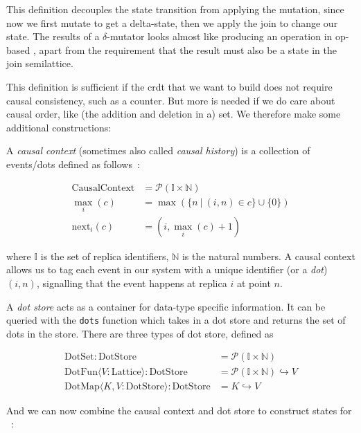 This definition decouples the state transition from applying the mutation, since
now we first mutate to get a delta-state, then we apply the join to change our
state. The results of a \(\delta\)-mutator looks almost like producing an operation
in op-based , apart from the requirement that the result must
also be a state in the join semilattice.

This definition is sufficient if the \acrshort{crdt} that we want to build does
not require causal consistency, such as a counter. But more is needed if we do
care about causal order, like (the addition and deletion in a) set. We therefore 
make some additional constructions:

A \emph{causal context} (sometimes also called \emph{causal history}) is a collection 
of events/dots defined as follows~\cite{almeida2018DeltaCRDT}:

\begin{align*}
  \mathrm{CausalContext} &= \mathcal P(\mathbb I\times \mathbb N) \\
  \max_i(c) &= \max(\{n\ |\ (i, n)\in c\} \cup \{0\}) \\
  \mathrm{next}_i(c) &= (i, \max_i(c) + 1)
\end{align*}

\noindent where \(\mathbb I\) is the set of replica identifiers, \(\mathbb N\)
is the natural numbers. A causal context allows us to tag each event in our system
with a unique identifier (or a \emph{dot}) \((i, n)\), signalling that the event 
happens at replica \(i\) at point \(n\). 

A \emph{dot store} acts as a container for data-type specific information. It can be
queried with the \verb|dots| function which takes in a dot store and returns the 
set of dots in the store. There are three types of dot store, defined as~\cite{almeida2018DeltaCRDT}

\begin{align*}
  \mathrm{DotSet}:\mathrm{DotStore} &= \mathcal P(\mathbb I\times \mathbb N) \\
  \mathrm{DotFun}\langle V:\mathrm{Lattice}\rangle: \mathrm{DotStore} &= \mathcal P(\mathbb I\times \mathbb N) \hookrightarrow V \\ 
  \mathrm{DotMap}\langle K, V:\mathrm{DotStore}\rangle: \mathrm{DotStore} &= K\hookrightarrow V
\end{align*}

And we can now combine the causal context and dot store to construct states for
~\cite{almeida2018DeltaCRDT}:

